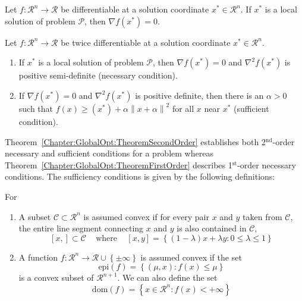 \begin{thm}\label{Chapter:GlobalOpt:TheoremFirstOrder}
Let $f:\mathcal{R}^{n}\rightarrow\mathcal{R}$ be differentiable at a solution coordinate $x^{\ast}\in\mathcal{R}^{n}$. If $x^{\ast}$ is a local solution of problem $\mathcal{P}$, then $\nabla f\left(x^{\ast}\right)=0$.
\end{thm}

\begin{thm}\label{Chapter:GlobalOpt:TheoremSecondOrder}
Let $f:\mathcal{R}^{n}\rightarrow\mathcal{R}$ be twice differentiable at a solution coordinate $x^{\ast}\in\mathcal{R}^{n}$. 
   \begin{enumerate}
       \item If $x^{\ast}$ is a local solution of problem $\mathcal{P}$, then $\nabla f\left(x^{\ast}\right)=0$ and $\nabla^{2}f\left(x^{\ast}\right)$ is positive semi-definite (necessary condition).
       \item If $\nabla f\left(x^{\ast}\right)=0$ and $\nabla^{2}f\left(x^{\ast}\right)$ is positive definite, then there is an $\alpha > 0$ such that $f\left(x\right)\ge\left(x^{\ast}\right)+\alpha\left\|x+\alpha\right\|^{2}$ for all $x$ near $x^{\ast}$ (sufficient condition).
   \end{enumerate}
\end{thm}
Theorem~\ref{Chapter:GlobalOpt:TheoremSecondOrder} establishes both 2$^{\text{nd}}$-order necessary and sufficient conditions for a problem whereas Theorem~\ref{Chapter:GlobalOpt:TheoremFirstOrder} describes 1$^{\text{st}}$-order necessary conditions. The sufficiency conditions is given by the following definitions:

\begin{defn} For
   \begin{enumerate}
       \item A subset $\mathcal{C}\subset\mathcal{R}^{n}$ is assumed convex if for every pair $x$ and $y$ taken from $\mathcal{C}$, the entire line segment connecting $x$ and $y$ is also contained in $\mathcal{C}$,
           \begin{displaymath}
              \left[x,\right]\subset\mathcal{C}\;\;\;\text{ where }\;\;\; \left[x,y\right]=\left\{\left(1-\lambda\right)x +\lambda y : 0\le\lambda\le 1\right\}
           \end{displaymath}
       \item A function $f:\mathcal{R}^{n}\rightarrow \mathcal{R}\cup\left\{\pm\infty\right\}$ is assumed convex if the set
           \begin{displaymath}
              \text{epi}(f) = \left\{\left(\mu,x\right): f(x)\le \mu\right\}
           \end{displaymath}
           is a convex subset of $\mathcal{R}^{n+1}$. We can also define the set 
           \begin{displaymath}
              \text{dom}(f) = \left\{x\in\mathcal{R}^{n} : f(x) < +\infty\right\}
           \end{displaymath}
   \end{enumerate}
\end{defn}

